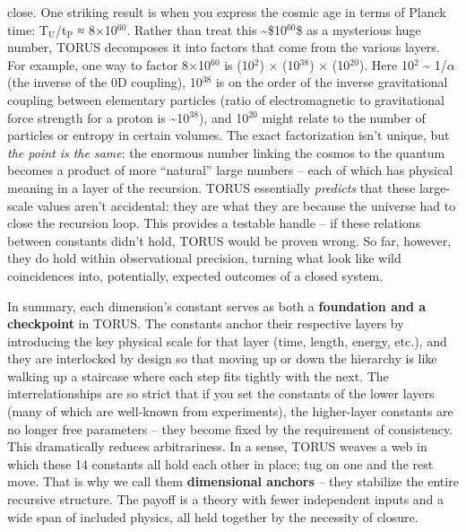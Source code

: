 \documentclass[]{article}
\newcommand{\subscript}[1]{\ensuremath{_{\mathrm{#1}}}}
\newcommand{\superscript}[1]{\ensuremath{^{\mathrm{#1}}}}
\begin{document}
\begin{itemize}
  close. One striking result is when you express the cosmic age in terms
  of Planck time:
  T\subscript{U}/t\subscript{P}
  ≈ 8×10\superscript{60}​. Rather than treat this \textasciitilde{}\$10\superscript{60}\$ as
  a mysterious huge number, TORUS decomposes it into factors that come
  from the various layers​. For example, one way to factor 8×10\superscript{60} is
  (10\superscript{2}) × (10\superscript{38}) × (10\superscript{20})​. Here 10\superscript{2} \textasciitilde{}
  1/$\alpha$ (the inverse of the 0D coupling), 10\superscript{38} is on the order of the
  inverse gravitational coupling between elementary particles (ratio of
  electromagnetic to gravitational force strength for a proton is
  \textasciitilde{}10\superscript{38}), and 10\superscript{20} might relate to the number of
  particles or entropy in certain volumes​. The exact factorization
  isn't unique, but \emph{the point is the same}: the enormous number
  linking the cosmos to the quantum becomes a product of more
  ``natural'' large numbers -- each of which has physical meaning in a
  layer of the recursion​. TORUS essentially \emph{predicts} that these
  large-scale values aren't accidental: they are what they are because
  the universe had to close the recursion loop. This provides a testable
  handle -- if these relations between constants didn't hold, TORUS
  would be proven wrong​. So far, however, they do hold within
  observational precision, turning what look like wild coincidences
  into, potentially, expected outcomes of a closed system.
\end{itemize}

In summary, each dimension's constant serves as both a
\textbf{foundation and a checkpoint} in TORUS. The constants anchor
their respective layers by introducing the key physical scale for that
layer (time, length, energy, etc.), and they are interlocked by design
so that moving up or down the hierarchy is like walking up a staircase
where each step fits tightly with the next. The interrelationships are
so strict that if you set the constants of the lower layers (many of
which are well-known from experiments), the higher-layer constants are
no longer free parameters -- they become fixed by the requirement of
consistency​. This dramatically reduces arbitrariness. In a sense, TORUS
weaves a web in which these 14 constants all hold each other in place;
tug on one and the rest move. That is why we call them
\textbf{dimensional anchors} -- they stabilize the entire recursive
structure. The payoff is a theory with fewer independent inputs and a
wide span of included physics, all held together by the necessity of
closure.
\end{document}

